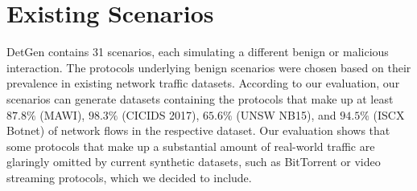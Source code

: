 \documentclass[runningheads]{llncs}
\begin{document}






 


\appendix


\section{Existing Scenarios}\label{Sec:ExistScen}

DetGen contains 31 scenarios, each simulating a different benign or malicious interaction. The protocols underlying benign scenarios were chosen based on their prevalence in existing network traffic datasets. %
According to our evaluation, our scenarios can generate datasets containing the protocols that make up at least $87.8\%$ (MAWI), $98.3\%$ (CICIDS 2017), $65.6\%$ (UNSW NB15), and $94.5\%$ (ISCX Botnet) of network flows in the respective dataset.
Our evaluation shows that some protocols that make up a substantial amount of real-world traffic are glaringly omitted by current synthetic datasets, such as BitTorrent or video streaming protocols, which we decided to include. 
\end{document}
